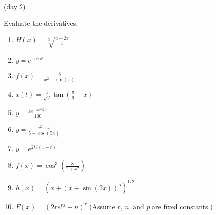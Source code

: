 \documentclass[11pt,fleqn]{article}
\begin{document}
\setlength{\parindent}{0cm}
\renewcommand{\headrulewidth}{0pt}
\newcommand{\blank}[1]{\rule{#1}{0.75pt}}
\renewcommand{\d}{\displaystyle}
\vspace*{-0.7in}
\begin{center}
 {\large{  (day 2)}}
\end{center}
Evaluate the derivatives.
\begin{enumerate}
\item $\d{H(x)=\sqrt[3]{\frac{4-2x}{5}}}$
	\vfill
\item $\d{y=e^{\sec \theta}}$
\vfill
\item $\d{f(x)=\frac{8}{x^2+\sin(x)}}$
\vfill
\item $\d{x(t)=\frac{1}{\sqrt{2}}\tan(\frac{\pi}{6}-x)}$
\vfill
\item $\d{y=\frac{xe^{-\pi x^2/10}}{100}}$
\vfill
\item $\d{y=\frac{e^2-x}{5+\cos(5x)}}$
\vfill
\newpage
\item $\d{y=e^{2t/(1-t)}}$
\vfill
\item $\d{f(x)=\cos^3(\frac{8}{1+x^2})}$
\vfill
\item $\d{h(x)=(x+(x+\sin(2x))^5)^{1/2}}$
\vfill
\item $\d{F(x)=(2re^{rx}+n)^p}$ (Assume $r$, $n$, and $p$ are fixed constants.)
\vfill
\end{enumerate}
\end{document}
